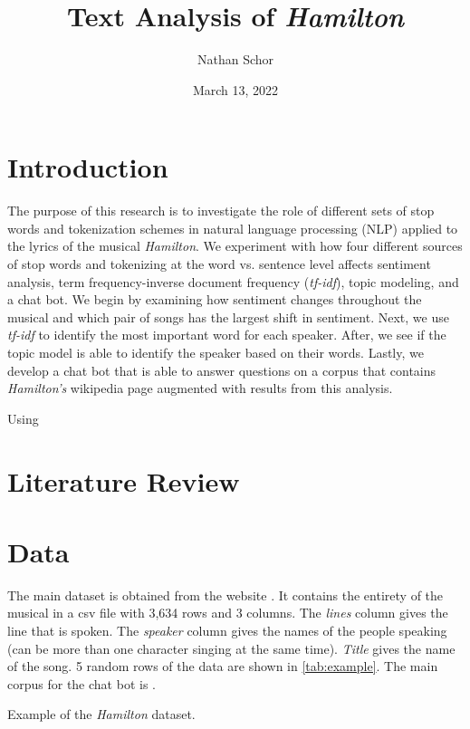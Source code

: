 \documentclass{article}
\title{Text Analysis of \emph{Hamilton}}
\author{Nathan Schor}
\date{March 13, 2022}
\begin{document}
\maketitle
\tableofcontents
\listoffigures

\section{Introduction}

The purpose of this research is to investigate the role of different sets of stop words and tokenization schemes in natural language processing (NLP) applied to the lyrics of the musical \emph{Hamilton}. We experiment with how four different sources of stop words and tokenizing at the word vs. sentence level affects sentiment analysis, term frequency-inverse document frequency (\emph{tf-idf}), topic modeling, and a chat bot. We begin by examining how sentiment changes throughout the musical and which pair of songs has the largest shift in sentiment. Next, we use \emph{tf-idf} to identify the most important word for each speaker. After, we see if the topic model is able to identify the speaker based on their words. Lastly, we develop a chat bot that is able to answer questions on a corpus that contains \emph{Hamilton's} wikipedia page augmented with results from this analysis. 

Using \cite{Silge2022}




\section{Literature Review}

\section{Data}

The main dataset is obtained from the website \cite{Kaggle2019}. It contains the entirety of the musical in a csv file with 3,634 rows and 3 columns. The \emph{lines} column gives the line that is spoken. The \emph{speaker} column gives the names of the people speaking (can be more than one character singing at the same time). \emph{Title} gives the name of the song. 5 random rows of the data are shown in \ref{tab:example}. The main corpus for the chat bot is \cite{Wiki}.

\begin{table}
\caption{Example of the \emph{Hamilton} dataset.}
\label{tab:example}

\end{table}
\end{document}
